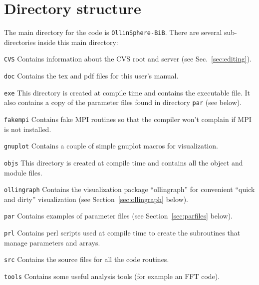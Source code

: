 \documentclass[12pt]{article}
\begin{document}
\section{Directory structure}

The main directory for the code is \texttt{OllinSphere-BiB}.  There are
several sub-directories inside this main directory:

\begin{list}{}{
\setlength{\leftmargin}{40mm}
\setlength{\labelsep}{10mm}
\setlength{\labelwidth}{25mm}}

\item[\texttt{CVS}] Contains information about the CVS root and server (see
Sec.~\ref{sec:editing}).

\item[\texttt{doc}] Contains the tex and pdf files for this user's
  manual.

\item[\texttt{exe}] This directory is created at compile time and
  contains the executable file.  It also contains a copy of the
  parameter files found in directory \texttt{par} (see below).

\item[\texttt{fakempi}] Contains fake MPI routines so that the
  compiler won't complain if MPI is not installed.

\item[\texttt{gnuplot}] Contains a couple of simple gnuplot macros for
  visualization.

\item[\texttt{objs}] This directory is created at compile time and
  contains all the object and module files.

\item[\texttt{ollingraph}] Contains the visualization package
  ``ollingraph'' for convenient ``quick and dirty'' visualization (see
  Section~\ref{sec:ollingraph} below).

\item[\texttt{par}] Contains examples of parameter files (see
Section~\ref{sec:parfiles} below).

\item[\texttt{prl}] Contains perl scripts used at compile time to create the
subroutines that manage parameters and arrays.

\item[\texttt{src}] Contains the source files for all the code routines.

\item[\texttt{tools}] Contains some useful analysis tools (for example an FFT code).

\end{list}
\end{document}
